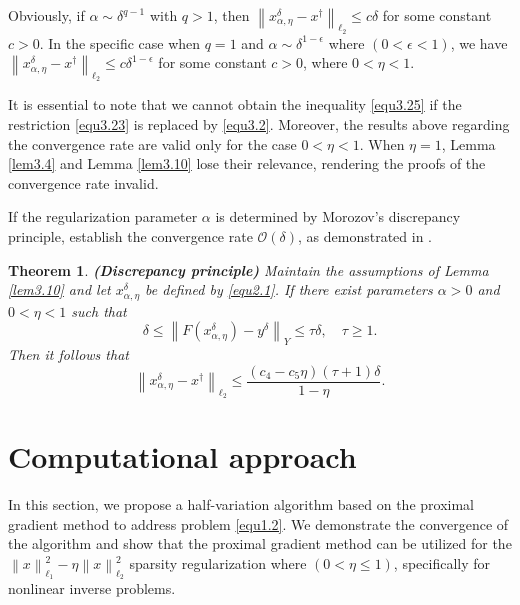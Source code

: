 \documentclass[a4paper,12pt]{article}
\newtheorem{theorem}{Theorem}[section]
\numberwithin{equation}{section}
\begin{document}
\par Obviously, if $\alpha\sim\delta^{q-1}$ with $q>1$, then $\left\|x_{\alpha,\eta}^{\delta}-x^{\dagger}\right\|_{\ell_{2}}\leq c\delta$ for some constant $c>0$. In the specific case when $q=1$ and $\alpha\sim\delta^{1-\epsilon}$ where $(0<\epsilon<1)$, we have $\left\|x_{\alpha,\eta}^{\delta}-x^{\dagger}\right\|_{\ell_{2}}\leq c\delta^{1-\epsilon}$ for some constant $c>0$, where $0<\eta< 1$.

\par It is essential to note that we cannot obtain the inequality \eqref{equ3.25} if the restriction \eqref{equ3.23} is replaced by \eqref{equ3.2}. Moreover, the results above regarding the convergence rate are valid only for the case $0<\eta< 1$. When $\eta=1$, Lemma \ref{lem3.4} and Lemma \ref{lem3.10} lose their relevance, rendering the proofs of the convergence rate invalid.

\par If the regularization parameter $\alpha$ is determined by Morozov's discrepancy principle, establish the convergence rate $\mathcal{O}\left(\delta\right)$, as demonstrated in \cite[Theorem 3.10]{LD25}.

\begin{theorem}\label{the3.12}
    \textbf{(Discrepancy principle)} Maintain the assumptions of Lemma \ref{lem3.10} and let $x_{\alpha,\eta}^{\delta}$ be defined by \eqref{equ2.1}. If there exist parameters $\alpha>0$ and $0<\eta<1$ such that
    \begin{equation*}
        \delta\leq\left\|F\left(x_{\alpha,\eta}^{\delta}\right)-y^{\delta}\right\|_{Y} \leq \tau\delta,\quad \tau\geq 1.
    \end{equation*}
    Then it follows that
    \begin{equation*}
        \left\|x_{\alpha,\eta}^{\delta}-x^{\dagger}\right\|_{\ell_{2}}\leq \frac{\left(c_{4}-c_{5}\eta\right)\left(\tau+1\right)\delta}{1-\eta}.
    \end{equation*}
\end{theorem}


\section{Computational approach}\label{sec4}

\par In this section, we propose a half-variation algorithm based on the proximal gradient method to address problem \eqref{equ1.2}. We demonstrate the convergence of the algorithm and show that the proximal gradient method can be utilized for the $\left\|x\right\|_{\ell_{1}}^{2}-\eta\left\|x\right\|_{\ell_{2}}^{2}$ sparsity regularization where $\left(0<\eta\leq 1\right)$, specifically for nonlinear inverse problems.
\end{document}
